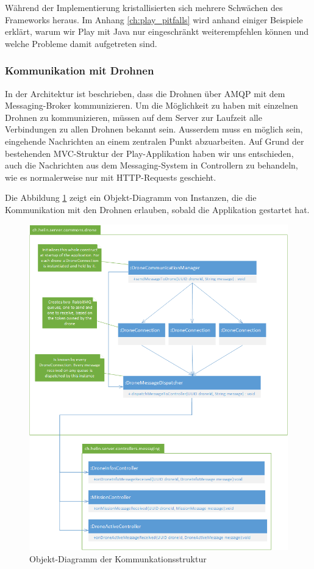 Während der Implementierung kristallisierten sich mehrere Schwächen des Frameworks heraus. 
Im Anhang \ref{ch:play_pitfalls} wird anhand einiger Beispiele erklärt, warum wir Play mit Java nur eingeschränkt weiterempfehlen können und welche Probleme damit aufgetreten sind.

\subsubsection{Kommunikation mit Drohnen}

In der Architektur ist beschrieben, dass die Drohnen über AMQP mit dem Messaging-Broker kommunizieren. Um die Möglichkeit zu haben mit einzelnen Drohnen zu kommunizieren, müssen auf dem Server zur Laufzeit alle Verbindungen zu allen Drohnen bekannt sein. Ausserdem muss en möglich sein, eingehende Nachrichten an einem zentralen Punkt abzuarbeiten. Auf Grund der bestehenden MVC-Struktur der Play-Applikation haben wir uns entschieden, auch die Nachrichten aus dem Messaging-System in Controllern zu behandeln, wie es normalerweise nur mit HTTP-Requests geschieht.

Die Abbildung \ref{fig:drone-communication-diagram} zeigt ein Objekt-Diagramm von Instanzen, die die Kommunikation mit den Drohnen erlauben, sobald die Applikation gestartet hat.

\begin{figure}[H]
	\centering
	\includegraphics[width=0.8\paperwidth] {images/drone-communication-diagram.png}
	\caption{Objekt-Diagramm der Kommunkationsstruktur}
	\label{fig:drone-communication-diagram}
\end{figure}

